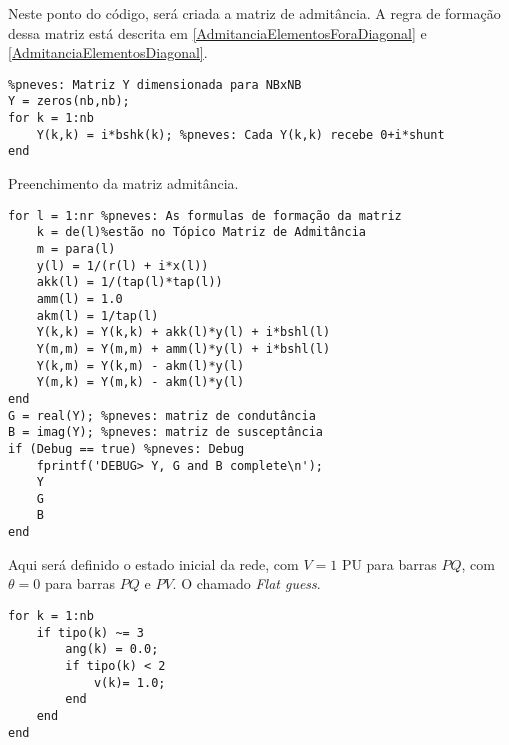 Neste ponto do código, será criada a matriz de admitância. A regra de formação dessa matriz está descrita em \ref{AdmitanciaElementosForaDiagonal} e \ref{AdmitanciaElementosDiagonal}. 
\begin{verbatim}
%pneves: Matriz Y dimensionada para NBxNB
Y = zeros(nb,nb);
for k = 1:nb
    Y(k,k) = i*bshk(k); %pneves: Cada Y(k,k) recebe 0+i*shunt
end
\end{verbatim}
Preenchimento da matriz admitância.
\begin{verbatim}
for l = 1:nr %pneves: As formulas de formação da matriz
    k = de(l)%estão no Tópico Matriz de Admitância  
    m = para(l)
    y(l) = 1/(r(l) + i*x(l))
    akk(l) = 1/(tap(l)*tap(l))
    amm(l) = 1.0
    akm(l) = 1/tap(l)
    Y(k,k) = Y(k,k) + akk(l)*y(l) + i*bshl(l)
    Y(m,m) = Y(m,m) + amm(l)*y(l) + i*bshl(l)
    Y(k,m) = Y(k,m) - akm(l)*y(l)
    Y(m,k) = Y(m,k) - akm(l)*y(l)
end
G = real(Y); %pneves: matriz de condutância 
B = imag(Y); %pneves: matriz de susceptância
if (Debug == true) %pneves: Debug
    fprintf('DEBUG> Y, G and B complete\n');
    Y
    G
    B
end
\end{verbatim}
Aqui será definido o estado inicial da rede, com $V = 1$ PU para barras $PQ$, com $\theta = 0$ para barras $PQ$ e $PV$. O chamado \textit{Flat guess}.
\begin{verbatim}
for k = 1:nb
    if tipo(k) ~= 3
        ang(k) = 0.0;
        if tipo(k) < 2
            v(k)= 1.0;
        end
    end
end
\end{verbatim}

